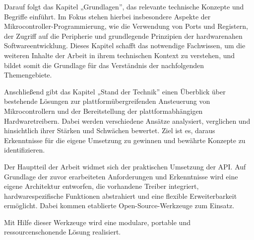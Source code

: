 Darauf folgt das Kapitel „Grundlagen”, das relevante technische Konzepte und Begriffe einführt. 
Im Fokus stehen hierbei insbesondere Aspekte der Mikrocontroller-Programmierung, wie die Verwendung von Ports und Registern, der Zugriff auf die Peripherie und grundlegende Prinzipien der hardwarenahen Softwareentwicklung. 
Dieses Kapitel schafft das notwendige Fachwissen, um die weiteren Inhalte der Arbeit in ihrem technischen Kontext zu verstehen, und bildet somit die Grundlage für das Verständnis der nachfolgenden Themengebiete.

Anschließend gibt das Kapitel „Stand der Technik” einen Überblick über bestehende Lösungen zur plattformübergreifenden Ansteuerung von Mikrocontrollern und der Bereitstellung der plattformabhängigen Hardwaretreibern.
Dabei werden verschiedene Ansätze analysiert, verglichen und hinsichtlich ihrer Stärken und Schwächen bewertet. 
Ziel ist es, daraus Erkenntnisse für die eigene Umsetzung zu gewinnen und bewährte Konzepte zu identifizieren.

Der Hauptteil der Arbeit widmet sich der praktischen Umsetzung der API.
Auf Grundlage der zuvor erarbeiteten Anforderungen und Erkenntnisse wird eine eigene Architektur entworfen, die vorhandene Treiber integriert, hardwarespezifische Funktionen abstrahiert und eine flexible Erweiterbarkeit ermöglicht.
Dabei kommen etablierte Open-Source-Werkzeuge zum Einsatz.

Mit Hilfe dieser Werkzeuge wird eine modulare, portable und ressourcenschonende Lösung realisiert.






















